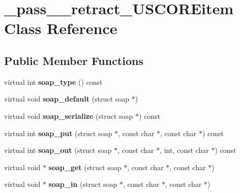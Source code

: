 \hypertarget{class__pass____retract__USCOREitem}{
\section{\_\-pass\_\-\_\-retract\_\-USCOREitem Class Reference}
\label{class__pass____retract__USCOREitem}
}
\subsection*{Public Member Functions}
\begin{DoxyCompactItemize}
\item 
\hypertarget{class__pass____retract__USCOREitem_a8dab71a64ea564620b924bbef0af41dc}{
virtual int {\bfseries soap\_\-type} () const }
\label{class__pass____retract__USCOREitem_a8dab71a64ea564620b924bbef0af41dc}

\item 
\hypertarget{class__pass____retract__USCOREitem_a7b0773769335332725a472eafd81dee8}{
virtual void {\bfseries soap\_\-default} (struct soap $\ast$)}
\label{class__pass____retract__USCOREitem_a7b0773769335332725a472eafd81dee8}

\item 
\hypertarget{class__pass____retract__USCOREitem_a14d0c609b86d1a24781482b2d93a856a}{
virtual void {\bfseries soap\_\-serialize} (struct soap $\ast$) const }
\label{class__pass____retract__USCOREitem_a14d0c609b86d1a24781482b2d93a856a}

\item 
\hypertarget{class__pass____retract__USCOREitem_a321bb8c37af96e6313a26871c2b0e064}{
virtual int {\bfseries soap\_\-put} (struct soap $\ast$, const char $\ast$, const char $\ast$) const }
\label{class__pass____retract__USCOREitem_a321bb8c37af96e6313a26871c2b0e064}

\item 
\hypertarget{class__pass____retract__USCOREitem_acfc7bd6f842a2a28d215ac4b036e5fef}{
virtual int {\bfseries soap\_\-out} (struct soap $\ast$, const char $\ast$, int, const char $\ast$) const }
\label{class__pass____retract__USCOREitem_acfc7bd6f842a2a28d215ac4b036e5fef}

\item 
\hypertarget{class__pass____retract__USCOREitem_aeac4b6cc4c4666de7e1c8f649ef8f82a}{
virtual void $\ast$ {\bfseries soap\_\-get} (struct soap $\ast$, const char $\ast$, const char $\ast$)}
\label{class__pass____retract__USCOREitem_aeac4b6cc4c4666de7e1c8f649ef8f82a}

\item 
\hypertarget{class__pass____retract__USCOREitem_ad1c3dc9f438862a7fb28b0b702d81603}{
virtual void $\ast$ {\bfseries soap\_\-in} (struct soap $\ast$, const char $\ast$, const char $\ast$)}
\label{class__pass____retract__USCOREitem_ad1c3dc9f438862a7fb28b0b702d81603}

\end{DoxyCompactItemize}
